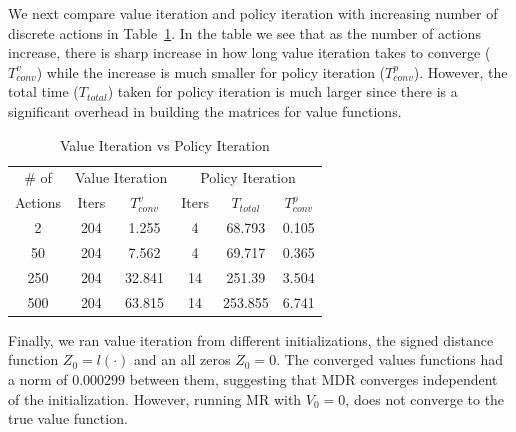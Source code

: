 We next compare value iteration and policy iteration with increasing number of discrete actions in Table~\ref{tab:v_vs_p}. In the table we see that as the number of actions increase, there is sharp increase in how long value iteration takes to converge ($T^{v}_{conv}$)  while the increase is much smaller for policy iteration ($T^{p}_{conv}$). However, the total time ($T_{total}$) taken for policy iteration is much larger since there is a significant overhead in building the matrices for value functions. 
\begin{table}
\centering
\caption{Value Iteration vs Policy Iteration}
\label{tab:v_vs_p}
\begin{tabular}{|c| c| c| c| c| c|}
\hline
\# of & \multicolumn{2}{|c|}{Value Iteration} & \multicolumn{3}{|c|}{Policy Iteration} \\ \cline{2-6}
Actions & Iters & $T^{v}_{conv}$ & Iters & $T_{total}$ & $T^{p}_{conv}$ \\ \hline
2 & 204 & 1.255 & 4 & 68.793 & 0.105 \\ \hline
50 & 204 & 7.562 & 4 & 69.717 & 0.365 \\ \hline
250 & 204 & 32.841 & 14 & 251.39 & 3.504 \\ \hline
500 & 204 & 63.815 & 14 & 253.855 & 6.741 \\
\hline
\end{tabular}
\end{table}

Finally, we ran value iteration from different initializations, the signed distance function $Z_0 = l(\cdot)$ and an all zeros $Z_0= 0$. The converged values functions had a norm of $0.000299$ between them, suggesting that MDR converges independent of the initialization. However, running MR with $V_0 = 0$, does not converge to the true value function.
